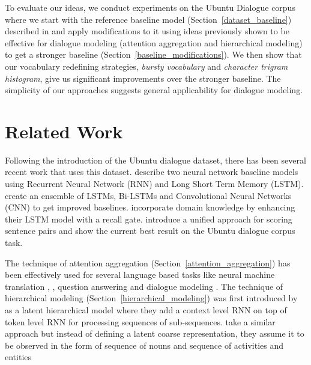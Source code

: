 \documentclass[11pt]{report}
\renewcommand\cite{\citep}	%
\begin{document}
To evaluate our ideas, we conduct experiments on the Ubuntu Dialogue corpus where we start with the reference baseline model (Section~\ref{dataset_baseline}) described in \cite{lowe2015ubuntu} and apply modifications to it using ideas previously shown to be effective for dialogue modeling (attention aggregation and hierarchical modeling) to get a stronger baseline (Section~\ref{baseline_modifications}). We then show that our vocabulary redefining strategies, \textit{bursty vocabulary} and \textit{character trigram histogram}, give us significant improvements over the stronger baseline.  The simplicity of our approaches suggests general applicability for dialogue modeling. %

\section{Related Work} \label{related_work}

Following the introduction of the Ubuntu dialogue dataset, there has been several recent work that uses this dataset. 
\cite{lowe2015ubuntu} describe two neural network baseline models using Recurrent Neural Network (RNN) and Long Short Term Memory (LSTM). %
\cite{kadlec2015improved} create an ensemble of LSTMs, Bi-LSTMs and Convolutional Neural Networks (CNN) to get improved baselines. 
\cite{xu2016incorporating} incorporate domain knowledge by enhancing their LSTM model with a recall gate.
\cite{baudivs2016sentence} introduce a unified approach for scoring sentence pairs %
and show the current best result on the Ubuntu dialogue corpus task. 

The technique of attention aggregation (Section~\ref{attention_aggregation}) has been effectively used for several language based tasks like neural machine translation \cite{bahdanau2014neural}, \cite{luong2015effective}, question answering \cite{hermann2015teaching} and dialogue modeling \cite{yao2016attentional}. 
The technique of hierarchical modeling (Section~\ref{hierarchical_modeling}) was first introduced by \cite{serban2016hierarchical} as a latent hierarchical model where they add a context level RNN on top of token level RNN for processing sequences of sub-sequences.
\cite{serban2016multiresolution} take a similar approach but instead of defining a latent coarse representation, they assume it to be observed in the form of sequence of nouns and sequence of activities and entities
\end{document}
